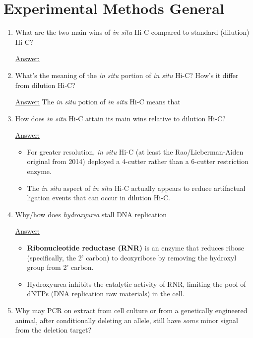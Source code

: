 \documentclass{article}
\newenvironment{QandA}{\begin{enumerate}[label=\bfseries Q\arabic*.]}
                       {\end{enumerate}}
\newenvironment{answered}{\par\normalfont\underline{Answer:}}{}
\begin{document}
\section{Experimental Methods General}
\begin{QandA}
  \item{What are the two main wins of \textit{in situ} Hi-C compared to standard (dilution) Hi-C?}
    \begin{answered}
    
    \end{answered}
  \item{What's the meaning of the \textit{in situ} portion of \textit{in situ} Hi-C? How's it differ from dilution Hi-C?}
    \begin{answered}
    The \textit{in situ} potion of \textit{in situ} Hi-C means that 
    \end{answered}
  \item{How does \textit{in situ} Hi-C attain its main wins relative to dilution Hi-C?}
    \begin{answered}
    \begin{itemize}
      \item{For greater resolution, \textit{in situ} Hi-C (at least the Rao/Lieberman-Aiden original from 2014) deployed a 4-cutter rather than a 6-cutter restriction enzyme.}
      \item{The \textit{in situ} aspect of \textit{in situ} Hi-C actually appears to reduce artifactual ligation events that can occur in dilution Hi-C. }
    \end{itemize}
    \end{answered}
  \item{Why/how does \textit{hydroxyurea} stall DNA replication}
    \begin{answered}
    \begin{itemize}
      \item{\textbf{Ribonucleotide reductase (RNR)} is an enzyme that reduces ribose (specifically, the 2' carbon) to deoxyribose by removing the hydroxyl group from 2' carbon.}
      \item{Hydroxyurea inhibits the catalytic activity of RNR, limiting the pool of dNTPs (DNA replication raw materials) in the cell.}
    \end{itemize}
    \end{answered}
  \item{Why may PCR on extract from cell culture or from a genetically engineered animal, after conditionally deleting an allele, still have \textit{some} minor signal from the deletion target?}

\end{QandA}
\end{document}
